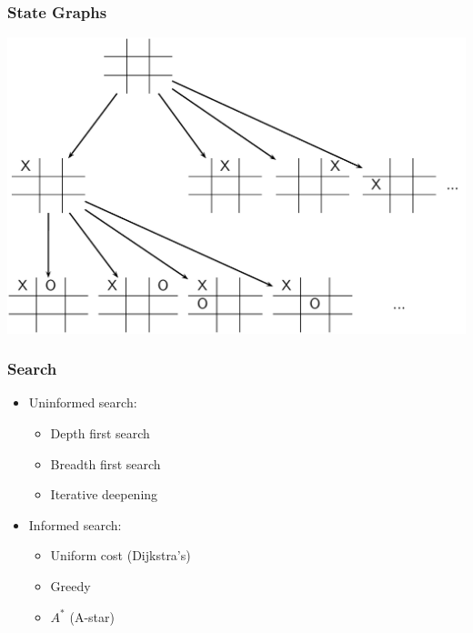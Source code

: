 \documentclass[handout,t,compress]{beamer}
\newcommand{\bframe}[1]{\begin{frame}[fragile]\frametitle{{#1}}}
\begin{document}
\bframe{State Graphs}
\includegraphics[scale=0.25]{graphsfigure03.png}


\end{frame}

\bframe{Search}
\begin{itemize}
\item Uninformed search:
\begin{itemize}
\item Depth first search
\item Breadth first search
\item Iterative deepening
\end{itemize}
\item Informed search:
\begin{itemize}
\item Uniform cost (Dijkstra's)
\item Greedy
\item $A^*$ (A-star)
\end{itemize}
\end{itemize}
\end{frame}
\end{document}
